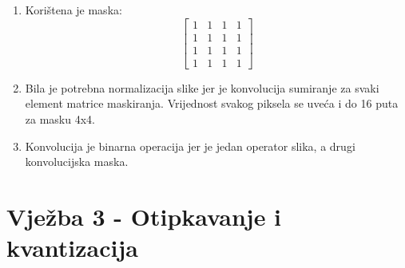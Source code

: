\documentclass[12pt, a4]{report}
\begin{document}
\begin{enumerate}
\begin{minipage}{\linewidth}
                    \end{minipage}
                \item
                    Korištena je maska:
                    \begin{equation}
                        \begin{bmatrix}
                            1 & 1 & 1 & 1 \\
                            1 & 1 & 1 & 1 \\
                            1 & 1 & 1 & 1 \\
                            1 & 1 & 1 & 1
                        \end{bmatrix}
                    \end{equation}
                \item
                    Bila je potrebna normalizacija slike jer je konvolucija sumiranje za svaki element matrice maskiranja. Vrijednost svakog piksela se uveća i do 16 puta za masku 4x4.
                \item
                    Konvolucija je binarna operacija jer je jedan operator slika, a drugi konvolucijska maska.
            \end{enumerate}
        \chapter{Vježba 3 - Otipkavanje i kvantizacija}
\end{document}

